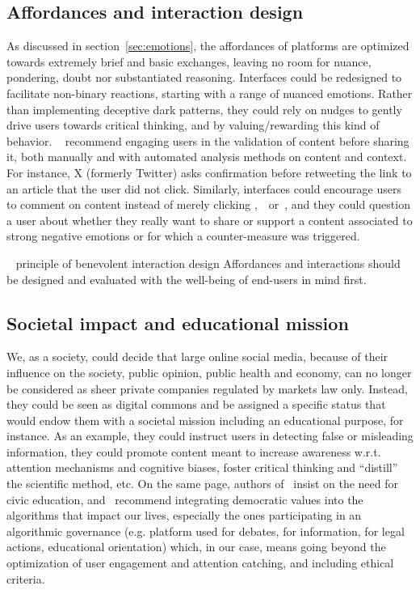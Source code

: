 \documentclass[10pt]{article}
\begin{document}
\subsection{Affordances and interaction design}
As discussed in section~\ref{sec:emotions}, the affordances of platforms are optimized towards extremely brief and basic exchanges, leaving no room for nuance, pondering, doubt nor substantiated reasoning.
Interfaces could be redesigned to facilitate non-binary reactions, starting with a range of nuanced emotions. 
%
Rather than implementing deceptive dark patterns, they could rely on nudges to gently drive users towards critical thinking, and by valuing/rewarding this kind of behavior.
~\cite{abreu_algorithm-driven_2021} recommend engaging users in the validation of content before sharing it, both manually and with automated analysis methods on content and context.
For instance, X (formerly Twitter) asks confirmation before retweeting the link to an article that the user did not click. 
Similarly, interfaces could encourage users to comment on content instead of merely clicking \faHeartO,~\faThumbsOUp~or~\faThumbsODown, and they could question a user about whether they really want to share or support a content associated to strong negative emotions or for which a counter-measure was triggered.

\begin{principle}{\faThumbTack ~ principle of benevolent interaction design}
Affordances and interactions should be designed and evaluated with the well-being of end-users in mind first.
\end{principle}



\subsection{Societal impact and educational mission}

We, as a society, could decide that large online social media, because of their influence on the society, public opinion, public health and economy, can no longer be considered as sheer private companies regulated by markets law only. Instead, they could be seen as digital commons and be assigned a specific status that would endow them with a societal mission including an educational purpose, for instance. 
%
As an example, they could instruct users in detecting false or misleading information, 
they could promote content meant to increase awareness w.r.t. attention mechanisms and cognitive biases, foster critical thinking and ``distill'' the scientific method, etc.
On the same page, authors of~\cite{abreu_algorithm-driven_2021} insist on the need for civic education, and~\cite{oneil2017weapons} recommend integrating democratic values into the algorithms that impact our lives, especially the ones participating in an algorithmic governance (e.g. platform used for debates, for information, for legal actions, educational orientation) which, in our case, means going beyond the optimization of user engagement and attention catching, and including ethical criteria.
\end{document}
